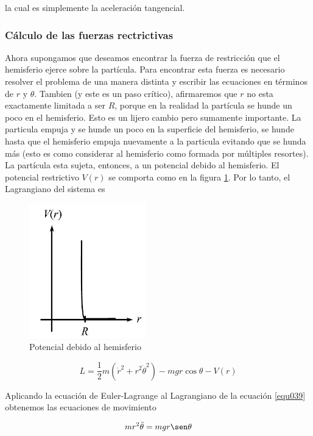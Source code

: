 \documentclass[12pt]{book}
\theoremstyle{definition}
\theoremstyle{remark}
\theoremstyle{plain}
\begin{document}
la cual es simplemente la aceleración tangencial.

\subsubsection{Cálculo de las fuerzas rectrictivas}

Ahora supongamos que deseamos encontrar la fuerza de restricción que el hemisferio ejerce sobre la partícula. Para encontrar esta fuerza es necesario resolver el problema de una manera distinta y escribir las ecuaciones en términos de $r$ y $\theta$. Tambien (y este es un paso crítico), afirmaremos que $r$ no esta exactamente limitada a ser $R$, porque en la realidad la partícula se hunde un poco en el hemisferio. Esto es un lijero cambio pero sumamente importante. La particula empuja y se hunde un poco en la superficie del hemisferio, se hunde hasta que el hemisferio empuja nuevamente a la particula evitando que se hunda más (esto es como considerar al hemisferio como formada por múltiples resortes). La partícula esta sujeta, entonces, a un potencial debido al hemisferio. El potencial restrictivo $V(r)$ se comporta como en la figura \ref{fig104}. Por lo tanto, el Lagrangiano del sistema es

\begin{figure}
\centering
\includegraphics[width=2in]{Potencialhemisferio.jpg}
\caption{Potencial debido al hemisferio}
\label{fig104}
\end{figure}

\begin{equation}
\label{equ039}
L = \frac{1}{2} m (\dot{r}^2 + r^2 \dot{\theta}^2)-m g r \cos \theta - V(r)
\end{equation}

Aplicando la ecuación de Euler-Lagrange al Lagrangiano de la ecuación \ref{equ039} obtenemos las ecuaciones de movimiento

\begin{equation}
\label{equ040}
m r^2 \ddot{\theta} = m g r \sen \theta
\end{equation}
\end{document}
